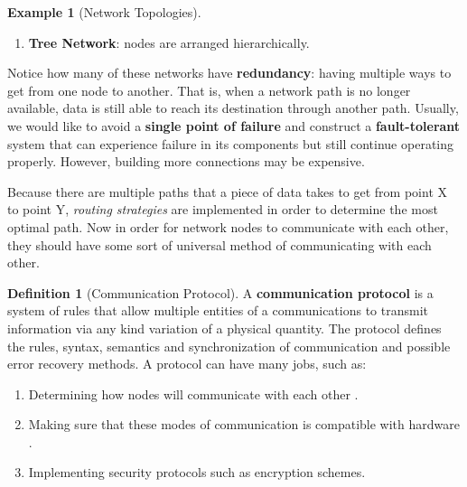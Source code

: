 \documentclass{article}
\theoremstyle{definition}
\newtheorem{example}{Example}[section]
\newtheorem{definition}{Definition}[section]
\begin{document}
\begin{example}[Network Topologies]
\begin{enumerate}
        \item \textbf{Tree Network}: nodes are arranged hierarchically.
          \begin{center}
          \end{center}
      \end{enumerate} 
    \end{example}

    Notice how many of these networks have \textbf{redundancy}: having multiple ways to get from one node to another. That is, when a network path is no longer available, data is still able to reach its destination through another path. Usually, we would like to avoid a \textbf{single point of failure} and construct a \textbf{fault-tolerant} system that can experience failure in its components but still continue operating properly. However, building more connections may be expensive. 

    Because there are multiple paths that a piece of data takes to get from point X to point Y, \textit{routing strategies} are implemented in order to determine the most optimal path. Now in order for network nodes to communicate with each other, they should have some sort of universal method of communicating with each other. 

    \begin{definition}[Communication Protocol]
      A \textbf{communication protocol} is a system of rules that allow multiple entities of a communications to transmit information via any kind variation of a physical quantity. The protocol defines the rules, syntax, semantics and synchronization of communication and possible error recovery methods. A protocol can have many jobs, such as: 
      
      \begin{enumerate} 
        \item Determining how nodes will communicate with each other . 
        \item Making sure that these modes of communication is compatible with hardware .
        \item Implementing security protocols such as encryption schemes. 
      \end{enumerate}
    \end{definition}
\end{document}
